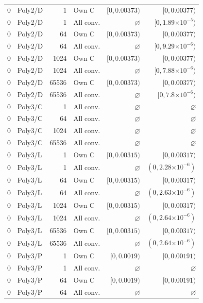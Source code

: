 \begin{longtable}{llrlrr}
0 & Poly2/D & 1 & Own C & $[0, 0.00373)$ & $[0, 0.00377)$ \\
0 & Poly2/D & 1 & All conv. & $\varnothing$ & $[0, 1.89\mathord{\times}10^{-5})$ \\
0 & Poly2/D & 64 & Own C & $[0, 0.00373)$ & $[0, 0.00377)$ \\
0 & Poly2/D & 64 & All conv. & $\varnothing$ & $[0, 9.29\mathord{\times}10^{-6})$ \\
0 & Poly2/D & 1024 & Own C & $[0, 0.00373)$ & $[0, 0.00377)$ \\
0 & Poly2/D & 1024 & All conv. & $\varnothing$ & $[0, 7.88\mathord{\times}10^{-6})$ \\
0 & Poly2/D & 65536 & Own C & $[0, 0.00373)$ & $[0, 0.00377)$ \\
0 & Poly2/D & 65536 & All conv. & $\varnothing$ & $[0, 7.8\mathord{\times}10^{-6})$ \\
0 & Poly3/C & 1 & All conv. & $\varnothing$ & $\varnothing$ \\
0 & Poly3/C & 64 & All conv. & $\varnothing$ & $\varnothing$ \\
0 & Poly3/C & 1024 & All conv. & $\varnothing$ & $\varnothing$ \\
0 & Poly3/C & 65536 & All conv. & $\varnothing$ & $\varnothing$ \\
0 & Poly3/L & 1 & Own C & $[0, 0.00315)$ & $[0, 0.00317)$ \\
0 & Poly3/L & 1 & All conv. & $\varnothing$ & $(0, 2.28\mathord{\times}10^{-6})$ \\
0 & Poly3/L & 64 & Own C & $[0, 0.00315)$ & $[0, 0.00317)$ \\
0 & Poly3/L & 64 & All conv. & $\varnothing$ & $(0, 2.63\mathord{\times}10^{-6})$ \\
0 & Poly3/L & 1024 & Own C & $[0, 0.00315)$ & $[0, 0.00317)$ \\
0 & Poly3/L & 1024 & All conv. & $\varnothing$ & $(0, 2.64\mathord{\times}10^{-6})$ \\
0 & Poly3/L & 65536 & Own C & $[0, 0.00315)$ & $[0, 0.00317)$ \\
0 & Poly3/L & 65536 & All conv. & $\varnothing$ & $(0, 2.64\mathord{\times}10^{-6})$ \\
0 & Poly3/P & 1 & Own C & $[0, 0.0019)$ & $[0, 0.00191)$ \\
0 & Poly3/P & 1 & All conv. & $\varnothing$ & $\varnothing$ \\
0 & Poly3/P & 64 & Own C & $[0, 0.0019)$ & $[0, 0.00191)$ \\
0 & Poly3/P & 64 & All conv. & $\varnothing$ & $\varnothing$ \\

\end{longtable}

